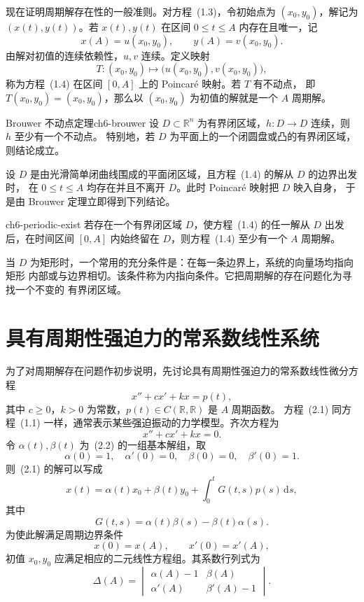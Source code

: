 现在证明周期解存在性的一般准则。对方程~(1.3)，令初始点为 $(x_0,y_0)$，解记为
$(x(t),y(t))$。若 $x(t),y(t)$ 在区间 $0\leq t\leq A$ 内存在且唯一，记
\[
  x(A)=u(x_0,y_0),\qquad y(A)=v(x_0,y_0). \tag{1.9}
\]
由解对初值的连续依赖性，$u,v$ 连续。定义映射
\[
  T:(x_0,y_0)\longmapsto\bigl(u(x_0,y_0),v(x_0,y_0)\bigr), \tag{1.10}
\]
称为方程~(1.4) 在区间 $[0,A]$ 上的 Poincar\'e 映射。若 $T$ 有不动点，
即 $T(x_0,y_0)=(x_0,y_0)$，那么以 $(x_0,y_0)$ 为初值的解就是一个 $A$ 周期解。

\begin{theorem}{Brouwer 不动点定理}{ch6-brouwer}
设 $D\subset\mathbb R^n$ 为有界闭区域，$h:D\to D$ 连续，则 $h$ 至少有一个不动点。
特别地，若 $D$ 为平面上的一个闭圆盘或凸的有界闭区域，则结论成立。
\end{theorem}

设 $D$ 是由光滑简单闭曲线围成的平面闭区域，且方程~(1.4) 的解从 $D$ 的边界出发时，
在 $0\leq t\leq A$ 均存在并且不离开 $D$。此时 Poincar\'e 映射把 $D$ 映入自身，
于是由 Brouwer 定理立即得到下列结论。

\begin{theorem}{}{ch6-periodic-exist}
若存在一个有界闭区域 $D$，使方程~(1.4) 的任一解从 $D$ 出发后，在时间区间
$[0,A]$ 内始终留在 $D$，则方程~(1.4) 至少有一个 $A$ 周期解。
\end{theorem}

当 $D$ 为矩形时，一个常用的充分条件是：在每一条边界上，系统的向量场均指向矩形
内部或与边界相切。该条件称为内指向条件。它把周期解的存在问题化为寻找一个不变的
有界闭区域。

\section{具有周期性强迫力的常系数线性系统}

为了对周期解存在问题作初步说明，先讨论具有周期性强迫力的常系数线性微分方程
\[
  x''+cx'+kx=p(t), \tag{2.1}
\]
其中 $c\geq0$，$k>0$ 为常数，$p(t)\in C(\mathbb R,\mathbb R)$ 是 $A$ 周期函数。
方程~(2.1) 同方程~(1.1) 一样，通常表示某些强迫振动的力学模型。齐次方程为
\[
  x''+cx'+kx=0. \tag{2.2}
\]
令 $\alpha(t),\beta(t)$ 为~(2.2) 的一组基本解组，取
\[
  \alpha(0)=1,\quad \alpha'(0)=0,\quad
  \beta(0)=0,\quad \beta'(0)=1.
\]
则~(2.1) 的解可以写成
\[
  x(t)=\alpha(t)x_0+\beta(t)y_0+\int_0^tG(t,s)p(s)\,\mathrm ds, \tag{2.3}
\]
其中
\[
  G(t,s)=\alpha(t)\beta(s)-\beta(t)\alpha(s). \tag{2.4}
\]
为使此解满足周期边界条件
\[
  x(0)=x(A),\qquad x'(0)=x'(A), \tag{2.5}
\]
初值 $x_0,y_0$ 应满足相应的二元线性方程组。其系数行列式为
\[
  \Delta(A)=\begin{vmatrix}
    \alpha(A)-1&\beta(A)\\
    \alpha'(A)&\beta'(A)-1
  \end{vmatrix}. \tag{2.7}
\]

